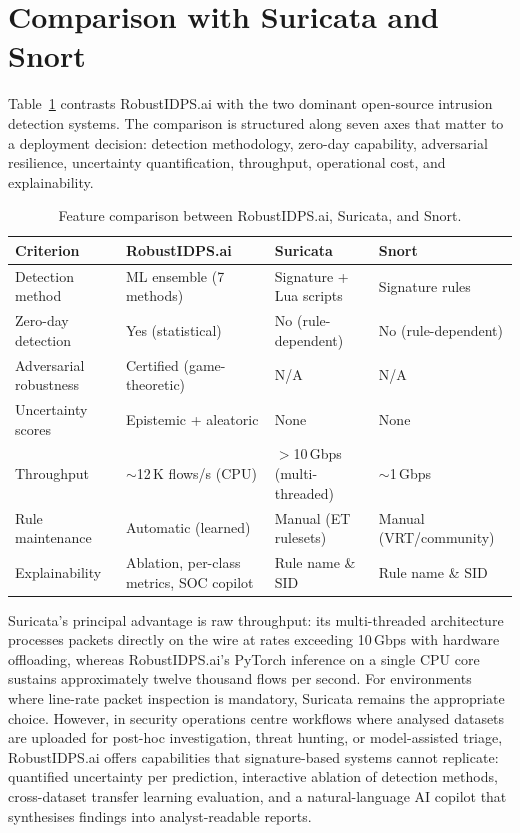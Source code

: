 \documentclass[11pt,a4paper]{article}
\begin{document}
\section{Comparison with Suricata and Snort}

Table~\ref{tab:comparison} contrasts RobustIDPS.ai with the two
dominant open-source intrusion detection systems. The comparison is
structured along seven axes that matter to a deployment decision:
detection methodology, zero-day capability, adversarial resilience,
uncertainty quantification, throughput, operational cost, and
explainability.

\begin{table}[H]
\centering
\caption{Feature comparison between RobustIDPS.ai, Suricata, and Snort.}
\label{tab:comparison}
\small
\begin{tabular}{@{}p{3cm}p{3.8cm}p{3cm}p{3cm}@{}}
\toprule
Criterion & RobustIDPS.ai & Suricata & Snort \\
\midrule
Detection method & ML ensemble (7 methods) & Signature + Lua scripts & Signature rules \\
Zero-day detection & Yes (statistical) & No (rule-dependent) & No (rule-dependent) \\
Adversarial robustness & Certified (game-theoretic) & N/A & N/A \\
Uncertainty scores & Epistemic + aleatoric & None & None \\
Throughput & $\sim$12\,K flows/s (CPU) & $>$10\,Gbps (multi-threaded) & $\sim$1\,Gbps \\
Rule maintenance & Automatic (learned) & Manual (ET rulesets) & Manual (VRT/community) \\
Explainability & Ablation, per-class metrics, SOC copilot & Rule name \& SID & Rule name \& SID \\
\bottomrule
\end{tabular}
\end{table}

Suricata's principal advantage is raw throughput: its multi-threaded
architecture processes packets directly on the wire at rates exceeding
10\,Gbps with hardware offloading, whereas RobustIDPS.ai's PyTorch
inference on a single CPU core sustains approximately twelve thousand
flows per second. For environments where line-rate packet inspection is
mandatory, Suricata remains the appropriate choice. However, in
security operations centre workflows where analysed datasets are uploaded
for post-hoc investigation, threat hunting, or model-assisted triage,
RobustIDPS.ai offers capabilities that signature-based systems cannot
replicate: quantified uncertainty per prediction, interactive ablation of
detection methods, cross-dataset transfer learning evaluation, and a
natural-language AI copilot that synthesises findings into analyst-readable
reports.
\end{document}

